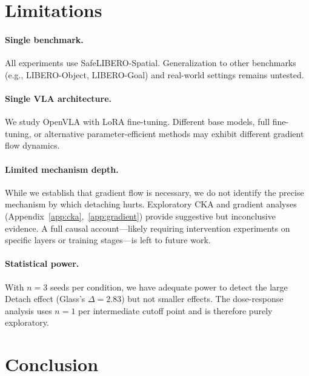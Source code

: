 \documentclass[letterpaper]{article}
\begin{document}
\section{Limitations}
\label{sec:limitations}

\paragraph{Single benchmark.}
All experiments use SafeLIBERO-Spatial.
Generalization to other benchmarks (e.g., LIBERO-Object, LIBERO-Goal) and real-world settings remains untested.

\paragraph{Single VLA architecture.}
We study OpenVLA with LoRA fine-tuning.
Different base models, full fine-tuning, or alternative parameter-efficient methods may exhibit different gradient flow dynamics.

\paragraph{Limited mechanism depth.}
While we establish that gradient flow is necessary, we do not identify the precise mechanism by which detaching hurts.
Exploratory CKA and gradient analyses (Appendix~\ref{app:cka},~\ref{app:gradient}) provide suggestive but inconclusive evidence.
A full causal account---likely requiring intervention experiments on specific layers or training stages---is left to future work.

\paragraph{Statistical power.}
With $n=3$ seeds per condition, we have adequate power to detect the large Detach effect (Glass's $\Delta=2.83$) but not smaller effects.
The dose-response analysis uses $n=1$ per intermediate cutoff point and is therefore purely exploratory.


\section{Conclusion}
\label{sec:conclusion}
\end{document}
